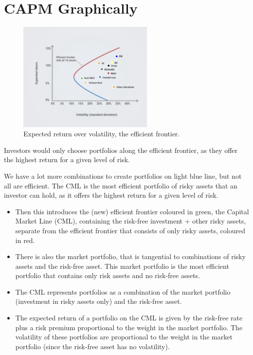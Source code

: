 \section{CAPM Graphically}
\begin{figure}[H]
    \centering
    \includegraphics[width=0.6\textwidth]{img/6.5.png}
    \caption{Expected return over volatility, the efficient frontier.}
    \label{fig:capm_graph}
\end{figure}

Investors would only choose portfolios along the efficient frontier, as they offer the highest return for a given level of risk. 

We have a lot more combinations to create portfolios on light blue line, but not all are efficient. The CML is the most efficient portfolio of risky assets that an investor can hold, as it offers the highest return for a given level of risk.\\

\begin{itemize}
    \item Then this introduces the (new) efficient frontier coloured in green, the Capital Market Line (CML), containing the risk-free investment + other risky assets, separate from the efficient frontier that consists of only risky assets, coloured in red.
    \item There is also the market portfolio, that is tangential to combinations of risky assets and the risk-free asset. This market portfolio is the most efficient portfolio that contains only risk assets and no risk-free assets.
    \item The CML represents portfolios as a combination of the market portfolio (investment in risky assets only) and the risk-free asset.
    \item The expected return of a portfolio on the CML is given by the risk-free rate plus a risk premium proportional to the weight in the market portfolio. The volatility of these portfolios are proportional to the weight in the market portfolio (since the risk-free asset has no volatility).
\end{itemize}

